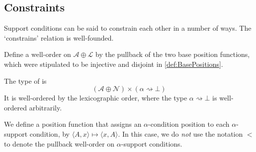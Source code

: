\subsection{Constraints}

Support conditions can be said to constrain each other in a number of ways.
The `constrains' relation is well-founded.

\begin{definition}
    Define a well-order on \( \mathcal A \oplus \mathcal L \) by the pullback of the two base position functions, which were stipulated to be injective and disjoint in \cref{def:BasePositions}.
\end{definition}
\begin{definition}
    The type of  is
    \[ (\mathcal A \oplus \mathcal N) \times (\alpha \rightsquigarrow \bot) \]
    It is well-ordered by the lexicographic order, where the type \( \alpha \rightsquigarrow \bot \) is well-ordered arbitrarily.
\end{definition}
\begin{definition}
    We define a position function that assigns an \( \alpha \)-condition position to each \( \alpha \)-support condition, by \( \langle A, x \rangle \mapsto \langle x, A \rangle \).
    In this case, we do \emph{not} use the notation \( < \) to denote the pullback well-order on \( \alpha \)-support conditions.
\end{definition}
